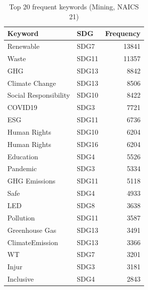 \begin{table}

\caption{Top 20 frequent keywords (Mining, NAICS 21)}
\centering
\begin{tabular}[t]{llr}
\toprule
Keyword & SDG & Frequency\\
\midrule
Renewable & SDG7 & 13841\\
Waste & SDG11 & 11357\\
GHG & SDG13 & 8842\\
Climate Change & SDG13 & 8506\\
Social Responsibility & SDG10 & 8422\\
\addlinespace
COVID19 & SDG3 & 7721\\
ESG & SDG11 & 6736\\
Human Rights & SDG10 & 6204\\
Human Rights & SDG16 & 6204\\
Education & SDG4 & 5526\\
\addlinespace
Pandemic & SDG3 & 5334\\
GHG Emissions & SDG11 & 5118\\
Safe & SDG4 & 4933\\
LED & SDG8 & 3638\\
Pollution & SDG11 & 3587\\
\addlinespace
Greenhouse Gas & SDG13 & 3491\\
ClimateEmission & SDG13 & 3366\\
WT & SDG7 & 3201\\
Injur & SDG3 & 3181\\
Inclusive & SDG4 & 2843\\
\bottomrule
\end{tabular}
\end{table}
